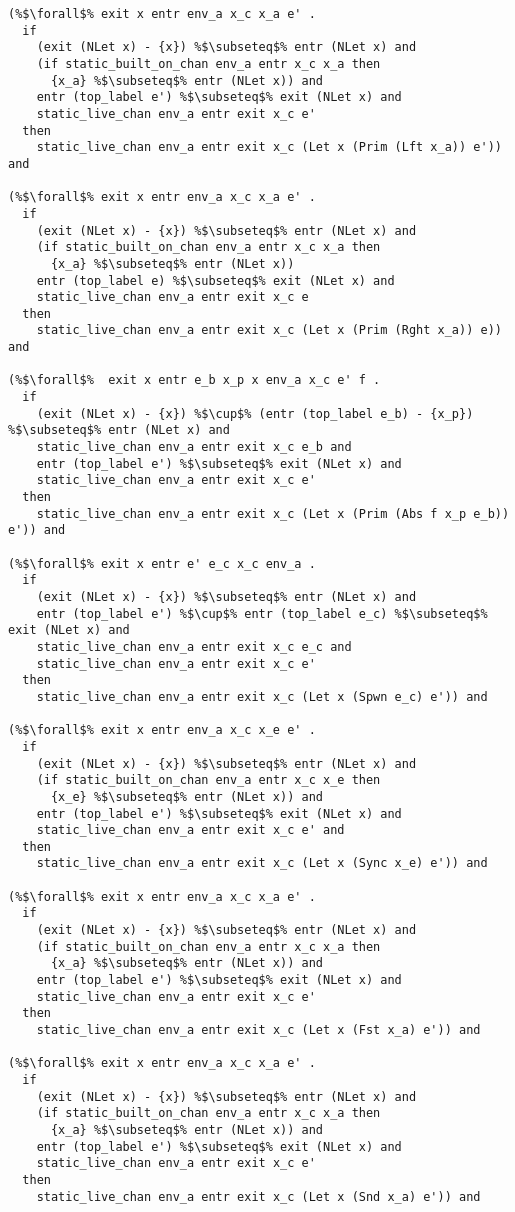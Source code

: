 \documentclass{article}
\begin{document}
\begin{lstlisting}[language=logic, style=codestyle1, escapechar=\%]
(%$\forall$% exit x entr env_a x_c x_a e' . 
  if
    (exit (NLet x) - {x}) %$\subseteq$% entr (NLet x) and
    (if static_built_on_chan env_a entr x_c x_a then
      {x_a} %$\subseteq$% entr (NLet x)) and
    entr (top_label e') %$\subseteq$% exit (NLet x) and
    static_live_chan env_a entr exit x_c e'
  then
    static_live_chan env_a entr exit x_c (Let x (Prim (Lft x_a)) e')) and

(%$\forall$% exit x entr env_a x_c x_a e' . 
  if
    (exit (NLet x) - {x}) %$\subseteq$% entr (NLet x) and
    (if static_built_on_chan env_a entr x_c x_a then
      {x_a} %$\subseteq$% entr (NLet x))
    entr (top_label e) %$\subseteq$% exit (NLet x) and
    static_live_chan env_a entr exit x_c e
  then
    static_live_chan env_a entr exit x_c (Let x (Prim (Rght x_a)) e)) and

(%$\forall$%  exit x entr e_b x_p x env_a x_c e' f . 
  if
    (exit (NLet x) - {x}) %$\cup$% (entr (top_label e_b) - {x_p}) %$\subseteq$% entr (NLet x) and
    static_live_chan env_a entr exit x_c e_b and
    entr (top_label e') %$\subseteq$% exit (NLet x) and
    static_live_chan env_a entr exit x_c e'
  then
    static_live_chan env_a entr exit x_c (Let x (Prim (Abs f x_p e_b)) e')) and

(%$\forall$% exit x entr e' e_c x_c env_a .
  if
    (exit (NLet x) - {x}) %$\subseteq$% entr (NLet x) and
    entr (top_label e') %$\cup$% entr (top_label e_c) %$\subseteq$% exit (NLet x) and
    static_live_chan env_a entr exit x_c e_c and
    static_live_chan env_a entr exit x_c e'
  then
    static_live_chan env_a entr exit x_c (Let x (Spwn e_c) e')) and

(%$\forall$% exit x entr env_a x_c x_e e' .
  if
    (exit (NLet x) - {x}) %$\subseteq$% entr (NLet x) and
    (if static_built_on_chan env_a entr x_c x_e then
      {x_e} %$\subseteq$% entr (NLet x)) and
    entr (top_label e') %$\subseteq$% exit (NLet x) and
    static_live_chan env_a entr exit x_c e' and
  then
    static_live_chan env_a entr exit x_c (Let x (Sync x_e) e')) and

(%$\forall$% exit x entr env_a x_c x_a e' .
  if
    (exit (NLet x) - {x}) %$\subseteq$% entr (NLet x) and
    (if static_built_on_chan env_a entr x_c x_a then
      {x_a} %$\subseteq$% entr (NLet x)) and
    entr (top_label e') %$\subseteq$% exit (NLet x) and
    static_live_chan env_a entr exit x_c e'
  then
    static_live_chan env_a entr exit x_c (Let x (Fst x_a) e')) and

(%$\forall$% exit x entr env_a x_c x_a e' .
  if 
    (exit (NLet x) - {x}) %$\subseteq$% entr (NLet x) and
    (if static_built_on_chan env_a entr x_c x_a then
      {x_a} %$\subseteq$% entr (NLet x)) and
    entr (top_label e') %$\subseteq$% exit (NLet x) and
    static_live_chan env_a entr exit x_c e'
  then
    static_live_chan env_a entr exit x_c (Let x (Snd x_a) e')) and


\end{lstlisting}
\end{document}
